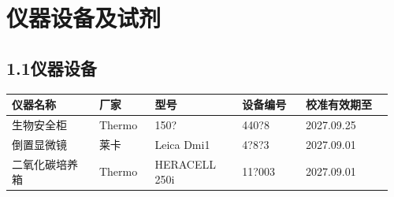 \documentclass[UTF8,10pt,a4paper,fontset=fandol]{ctexart}
\newcommand{\fieldvalue}[1]{#1}
\newcommand{\handwritten}[1]{#1}
\begin{document}
\section{仪器设备及试剂}

\subsection{1.1\quad 仪器设备}

\begin{tabular}{|p{0.22\linewidth}|p{0.14\linewidth}|p{0.22\linewidth}|p{0.16\linewidth}|p{0.22\linewidth}|}
\hline
\textbf{仪器名称} & \textbf{厂家} & \textbf{型号} & \textbf{设备编号} & \textbf{校准有效期至} \\ \hline
\fieldvalue{生物安全柜} &
\fieldvalue{Thermo} &
\fieldvalue{\handwritten{150?}} &
\fieldvalue{\handwritten{440?8}} &
\fieldvalue{\handwritten{2027.09.25}}
\\ \hline
\fieldvalue{倒置显微镜} &
\fieldvalue{莱卡} &
\fieldvalue{Leica Dmi1} &
\fieldvalue{\handwritten{4?8?3}} &
\fieldvalue{\handwritten{2027.09.01}}
\\ \hline
\fieldvalue{二氧化碳培养箱} &
\fieldvalue{Thermo} &
\fieldvalue{HERACELL 250i} &
\fieldvalue{\handwritten{11?003}} &
\fieldvalue{\handwritten{2027.09.01}}
\\ \hline

\end{tabular}
\end{document}
